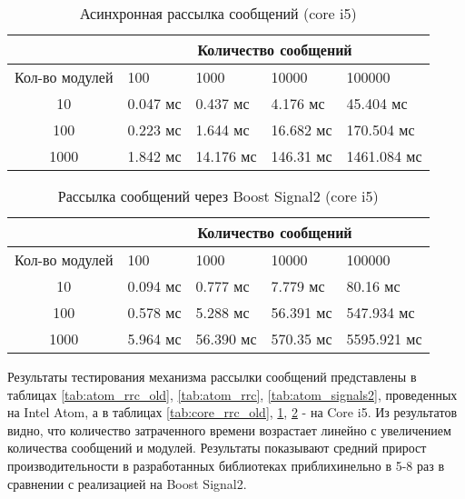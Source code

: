 \begin{table}[!htbp]
    \caption{\label{tab:core_rrc}Асинхронная рассылка сообщений (core i5)}
    \begin{center}
        \begin{tabularx}{\textwidth}{|c|X|X|X|X|}
            \hline
            & \multicolumn{4}{|c|}{Количество сообщений} \\
            \hline
            Кол-во модулей & 100   & 1000   & 10000   & 100000   \\
            \hline
            10             & 0.047 мс  & 0.437 мс   & 4.176 мс   & 45.404 мс   \\
            \hline
            100            & 0.223 мс  & 1.644 мс  & 16.682 мс  & 170.504 мс  \\
            \hline
            1000           & 1.842 мс & 14.176 мс & 146.31 мс & 1461.084 мс \\
            \hline
        \end{tabularx}
    \end{center}
\end{table}

\begin{table}[!htbp]
    \caption{\label{tab:core_signals2}Рассылка сообщений через Boost Signal2 (core i5)}
    \begin{center}
        \begin{tabularx}{\textwidth}{|c|X|X|X|X|}
            \hline
            & \multicolumn{4}{|c|}{Количество сообщений} \\
            \hline
            Кол-во модулей & 100   & 1000   & 10000   & 100000   \\
            \hline
            10             & 0.094 мс  & 0.777 мс   & 7.779 мс   
            & 80.16 мс   \\
            \hline
            100            & 0.578 мс  & 5.288 мс  & 56.391 мс  & 547.934 мс  \\
            \hline
            1000           & 5.964 мс & 56.390 мс & 570.35 мс & 5595.921 мс \\
            \hline
        \end{tabularx}
    \end{center}
\end{table}

Результаты тестирования механизма рассылки сообщений 
представлены в таблицах \ref{tab:atom_rrc_old}, 
\ref{tab:atom_rrc}, \ref{tab:atom_signals2}, проведенных на 
Intel Atom, а в таблицах \ref{tab:core_rrc_old}, 
\ref{tab:core_rrc}, \ref{tab:core_signals2} - на Core i5. Из 
результатов видно, что количество затраченного времени 
возрастает линейно с увеличением количества сообщений и модулей. 
Результаты показывают средний прирост производительности в 
разработанных библиотеках приблихинельно в 5-8 раз в сравнении с 
реализацией на Boost Signal2.


